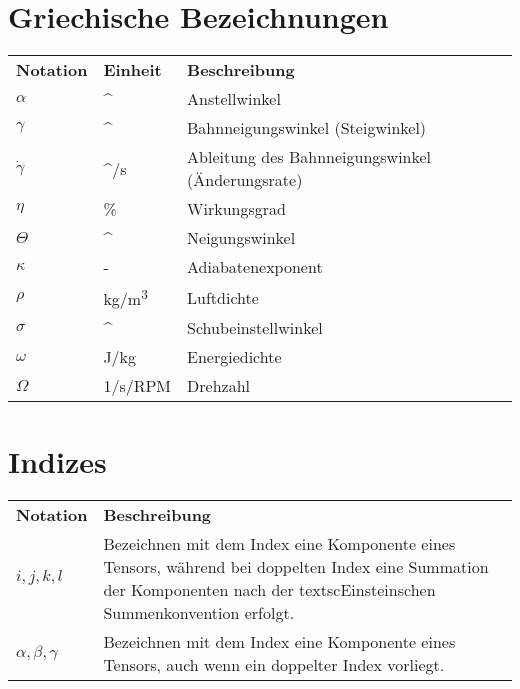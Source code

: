 \section*{Griechische Bezeichnungen}
\begin{longtable}{lp{2.5cm}p{10.5cm}}
	\textbf{Notation} & \textbf{Einheit} & \textbf{Beschreibung}\\
	\ensuremath{\alpha}	& \si{^\circ}		& Anstellwinkel \\
	\ensuremath{\gamma}	& \si{^\circ}		& Bahnneigungswinkel (Steigwinkel)\\
	\ensuremath{\dot{\gamma}}& \si{^\circ /s}& Ableitung des Bahnneigungswinkel (Änderungsrate) \\
	\ensuremath{\eta}	& \si{\%}			& Wirkungsgrad \\
	\ensuremath{\Theta} & \si{^\circ}		& Neigungswinkel \\
	\ensuremath{\kappa}	& -					& Adiabatenexponent \\
	\ensuremath{\rho}	& \si{kg/m^3}		& Luftdichte \\
	\ensuremath{\sigma}	& \si{^\circ}		& Schubeinstellwinkel\\
	\ensuremath{\omega}	& \si{J/kg}			& Energiedichte \\
	\ensuremath{\Omega}	& \si{1/s}/\si{RPM}	& Drehzahl
	
		
	
	
\end{longtable}
%
\section*{Indizes}
\begin{longtable}{lp{13cm}}
	\textbf{Notation} & \textbf{Beschreibung}\\
	$i, j, k, l$ & Bezeichnen mit dem Index eine Komponente eines Tensors,
		während bei doppelten Index eine Summation der Komponenten nach
		der textsc{Einstein}schen Summenkonvention erfolgt.\\
    $\alpha , \beta , \gamma$ & Bezeichnen mit dem Index eine Komponente eines
    	Tensors, auch wenn ein doppelter Index vorliegt.
\end{longtable}
%
